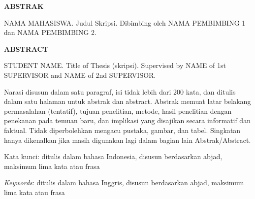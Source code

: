 
\clearpage
\thispagestyle{empty}

\begin{center}
{\fontsize{14pt}{17pt}\selectfont\bfseries ABSTRAK}
\end{center}

\vspace{6pt}

NAMA MAHASISWA. Judul Skripsi.
Dibimbing oleh NAMA PEMBIMBING 1 dan NAMA PEMBIMBING 2.

\vspace{12pt}

\begin{center}
{\fontsize{14pt}{17pt}\selectfont\bfseries ABSTRACT}
\end{center}

\vspace{6pt}

STUDENT NAME. Title of Thesis (skripsi).
Supervised by NAME of 1st SUPERVISOR and NAME of 2nd SUPERVISOR.

\vspace{12pt}

Narasi disusun dalam satu paragraf, isi tidak lebih dari 200 kata,
dan ditulis dalam satu halaman untuk abstrak dan abstract.
Abstrak memuat latar belakang permasalahan (tentatif), tujuan penelitian,
metode, hasil penelitian dengan penekanan pada temuan baru, dan implikasi
yang disajikan secara informatif dan faktual.
Tidak diperbolehkan mengacu pustaka, gambar, dan tabel.
Singkatan hanya dikenalkan jika masih digunakan lagi dalam bagian lain
Abstrak/Abstract.

\vspace{12pt}

\noindent
Kata kunci: ditulis dalam bahasa Indonesia, disusun berdasarkan abjad,
maksimum lima kata atau frasa

\vspace{6pt}

\noindent
\textit{Keywords}: ditulis dalam bahasa Inggris, disusun berdasarkan abjad,
maksimum lima kata atau frasa
